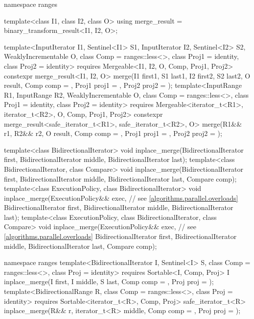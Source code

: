 \begin{codeblock}
{  namespace ranges {
    template<class I1, class I2, class O>
    using merge_result = binary_transform_result<I1, I2, O>;

    template<InputIterator I1, Sentinel<I1> S1, InputIterator I2, Sentinel<I2> S2,
             WeaklyIncrementable O, class Comp = ranges::less<>, class Proj1 = identity,
             class Proj2 = identity>
      requires Mergeable<I1, I2, O, Comp, Proj1, Proj2>
      constexpr merge_result<I1, I2, O>
        merge(I1 first1, S1 last1, I2 first2, S2 last2, O result,
              Comp comp = {}, Proj1 proj1 = {}, Proj2 proj2 = {});
    template<InputRange R1, InputRange R2, WeaklyIncrementable O, class Comp = ranges::less<>,
             class Proj1 = identity, class Proj2 = identity>
      requires Mergeable<iterator_t<R1>, iterator_t<R2>, O, Comp, Proj1, Proj2>
      constexpr merge_result<safe_iterator_t<R1>, safe_iterator_t<R2>, O>
        merge(R1&& r1, R2&& r2, O result,
              Comp comp = {}, Proj1 proj1 = {}, Proj2 proj2 = {});
  }

  template<class BidirectionalIterator>
    void inplace_merge(BidirectionalIterator first,
                       BidirectionalIterator middle,
                       BidirectionalIterator last);
  template<class BidirectionalIterator, class Compare>
    void inplace_merge(BidirectionalIterator first,
                       BidirectionalIterator middle,
                       BidirectionalIterator last, Compare comp);
  template<class ExecutionPolicy, class BidirectionalIterator>
    void inplace_merge(ExecutionPolicy&& exec, // see \ref{algorithms.parallel.overloads}
                       BidirectionalIterator first,
                       BidirectionalIterator middle,
                       BidirectionalIterator last);
  template<class ExecutionPolicy, class BidirectionalIterator, class Compare>
    void inplace_merge(ExecutionPolicy&& exec, // see \ref{algorithms.parallel.overloads}
                       BidirectionalIterator first,
                       BidirectionalIterator middle,
                       BidirectionalIterator last, Compare comp);

  namespace ranges {
    template<BidirectionalIterator I, Sentinel<I> S, class Comp = ranges::less<>,
             class Proj = identity>
      requires Sortable<I, Comp, Proj>
      I inplace_merge(I first, I middle, S last, Comp comp = {}, Proj proj = {});
    template<BidirectionalRange R, class Comp = ranges::less<>, class Proj = identity>
      requires Sortable<iterator_t<R>, Comp, Proj>
      safe_iterator_t<R>
        inplace_merge(R&& r, iterator_t<R> middle, Comp comp = {},
                      Proj proj = {});
  }

}
\end{codeblock}
